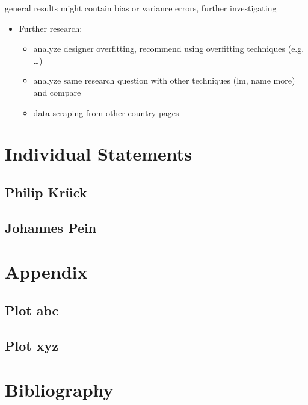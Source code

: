 \documentclass[a4paper, nobind]{templates/ociamthesis}
\providecommand{\tightlist}{%
  \setlength{\itemsep}{0pt}\setlength{\parskip}{0pt}}
\begin{document}
general results might contain bias or variance errors, further investigating

\begin{itemize}
\tightlist
\item
  Further research:

  \begin{itemize}
  \tightlist
  \item
    analyze designer overfitting, recommend using overfitting techniques (e.g. \ldots{})
  \item
    analyze same research question with other techniques (lm, name more) and compare
  \item
    data scraping from other country-pages
  \end{itemize}
\end{itemize}

\hypertarget{individual-statements}{%
\chapter{Individual Statements}\label{individual-statements}}

\hypertarget{philip-kruxfcck}{%
\section{Philip Krück}\label{philip-kruxfcck}}

\hypertarget{johannes-pein}{%
\section{Johannes Pein}\label{johannes-pein}}

\startappendices

\hypertarget{appendix}{%
\chapter{Appendix}\label{appendix}}

\hypertarget{plot-abc}{%
\section{Plot abc}\label{plot-abc}}

\hypertarget{plot-xyz}{%
\section{Plot xyz}\label{plot-xyz}}

\hypertarget{bibliography}{%
\chapter{Bibliography}\label{bibliography}}
\end{document}
